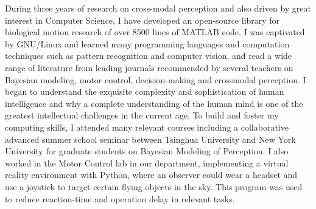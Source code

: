 
During three years of research on cross-modal perception and also driven by great interest in Computer Science, I have developed an open-source library for biological motion research of over 8500 lines of MATLAB code. I was captivated by GNU/Linux and learned many programming languages and computation techniques such as pattern recognition and computer vision, and read a wide range of literature from leading journals recommended by several teachers on Bayesian modeling, motor control, decision-making and crossmodal perception. I began to understand the exquisite complexity and sophistication of human intelligence and why a complete understanding of the human mind is one of the greatest intellectual challenges in the current age. To build and foster my computing skills, I attended many relevant courses including a collaborative advanced summer school seminar between Tsinghua University and New York University for graduate students on Bayesian Modeling of Perception. I also worked in the Motor Control lab in our department, implementing a virtual reality environment with Python, where an observer could wear a headset and use a joystick to target certain flying objects in the sky. This program was used to reduce reaction-time and operation delay in relevant tasks.

